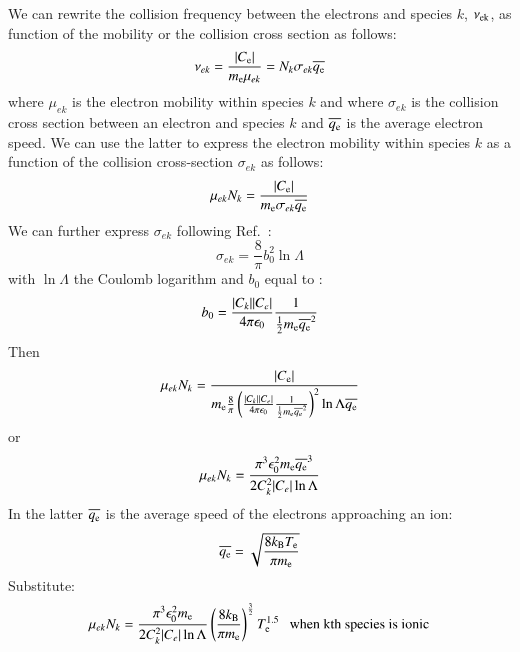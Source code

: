 \documentclass{warpdoc}
\begin{document}
We can rewrite the collision frequency between the electrons and species $k$,  $\nu_{\rm ek}$, as function of the mobility \cite[page 9]{book:1991:raizer} or the collision cross section as follows:
%
\begin{equation}
\nu_{ek} = \frac{|C_{\rm e}|}{m_{\rm e} \mu_{ek}} = N_k \sigma_{ek} \overline{q_{\rm e}} 
\end{equation}
%
where $\mu_{ek}$ is the electron mobility within species $k$ and where  $\sigma_{ek}$ is the collision cross section between an electron and species $k$ and $\overline{q_{\rm e}}$ is the average electron speed.  We can use the latter to express the electron mobility within species $k$ as a function of the collision cross-section $\sigma_{ek}$ as follows:
%
\begin{equation}
\mu_{ek}N_k = \frac{|C_{\rm e}|}{m_{\rm e} \sigma_{ek} \overline{q_{\rm e}}}   
\end{equation}
%
We can further express  $\sigma_{ek}$ following Ref.~\cite[page 58]{book:2004:lieberman}:
%
\begin{equation}
\sigma_{ek}= \frac{8}{\pi} b_0^2 \ln \Lambda
\end{equation}
%
with $\ln \Lambda$ the Coulomb logarithm and $b_0$ equal to \cite[page 56]{book:2004:lieberman}:
%
\begin{equation}
b_0 = \frac{|C_k| |C_e|}{4 \pi \epsilon_0 } \frac{1}{\frac{1}{2} m_{\rm e} \overline{q_{\rm e}}^2}
\end{equation}
%
Then 
%
\begin{equation}
\mu_{ek}N_k = \frac{|C_{\rm e}|}{m_{\rm e} \frac{8}{\pi} \left(\frac{|C_k| |C_e|}{4 \pi \epsilon_0 } \frac{1}{\frac{1}{2} m_{\rm e} \overline{q_{\rm e}}^2} \right)^2 \ln \Lambda \overline{q_{\rm e}}}   
\end{equation}
%
or
%
\begin{equation}
\mu_{ek}N_k = \frac{ \pi^3 \epsilon_0^2 m_{\rm e} \overline{q_{\rm e}}^3}{ 2  C_k^2 |C_e| \ln \Lambda }   
\end{equation}
%
In the latter $\overline{q_{\rm e}}$ is the average speed of the electrons approaching an ion:
%
\begin{equation}
\overline{q_{\rm e}} = \sqrt{\frac{8 k_{\rm B} T_{\rm e}}{\pi m_{\rm e}}}
\end{equation}
%
Substitute:
%
\begin{equation}
\mu_{ek}N_k = \frac{ \pi^3 \epsilon_0^2 m_{\rm e}}{ 2  C_k^2 |C_e| \ln \Lambda } 
\left(\frac{8 k_{\rm B} }{\pi m_{\rm e}}\right)^\frac{3}{2} T_{\rm e}^{1.5} {\rm ~~~when~kth~species~is~ionic}
\end{equation}
\end{document}
